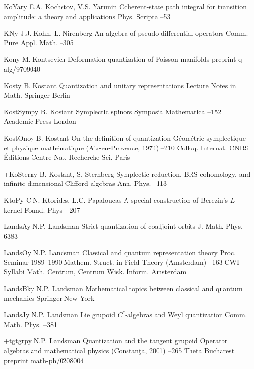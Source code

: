 \documentclass[11pt]{amsart}
\numberwithin{equation}{section}
\theoremstyle{remark}
\newcommand{\by}{\mathbf y}
\begin{document}
\begin{thebibliography}{199}
 KoYar\by{ E.A. Kochetov, V.S. Yarunin \paper Coherent-state path integral
for transition amplitude: a theory and applications \jour Phys. Scripta 
 --53}

 KN\by{ J.J. Kohn, L. Nirenberg \paper An algebra of pseudo-differential
operators \jour Comm. Pure Appl. Math.   --305}

 Kon\by{ M. Kontsevich \paper Deformation quantization of Poisson
manifolds \jour preprint q-alg/9709040 }

 Kost\by{ B. Kostant \paper Quantization and unitary representations
\inbook Lecture Notes in Math.   \publ Springer \publaddr Berlin
}

 KostSymp\by{ B. Kostant \paper Symplectic spinors \inbook Symposia
Mathematica  --152 \publ Academic Press \publaddr London
}

 KostOno\by{ B. Kostant \paper On the definition of quantization \inbook
G\'eom\'etrie symplectique et physique math\'ematique (Aix-en-Provence, 1974)
--210 \bookinfo Colloq. Internat. CNRS  \publ \'Editions
Centre Nat. Recherche Sci. \publaddr Paris }

 +KoStern\by{ B. Kostant, S. Sternberg \paper Symplectic reduction,
BRS cohomology, and infinite-dimensional Clifford algebras \jour Ann. Phys.
  --113}

 KtoP\by{ C.N. Ktorides, L.C. Papaloucas \paper A special construction of
Berezin's $L$-kernel \jour Found. Phys.   --207}

 LandsA\by{ N.P. Landsman \paper Strict quantization of coadjoint orbits
\jour J. Math. Phys.   --6383}

 LandsO\by{ N.P. Landsman \paper Classical and quantum representation
theory \inbook Proc. Seminar 1989--1990 Mathem. Struct. in Field Theory
(Amsterdam) --163 \bookinfo CWI Syllabi  \publ Math. Centrum,
Centrum Wisk. Inform. Amsterdam }

 LandsBk\by{ N.P. Landsman \book Mathematical topics between classical and
quantum mechanics \publ Springer \publaddr New York }

 LandsJ\by{ N.P. Landsman \paper Lie grupoid $C^*$-algebras and Weyl
quantization \jour Comm. Math. Phys.   --381}

 +tgtgrp\by{ N.P. Landsman \paper Quantization and the tangent grupoid
\inbook Operator algebras and mathematical physics (Constan\c{t}a, 2001)
--265 \publ Theta \publaddr Bucharest  \paperinfo preprint
math-ph/0208004}


\end{thebibliography}
\end{document}
